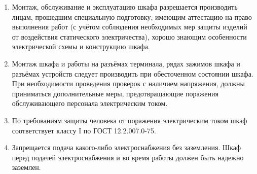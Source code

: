 \begin{enumerate}[label=\arabic{section}.\arabic{subsection}.\arabic{subsubsection}.\arabic*, align=left, labelsep=4pt, leftmargin=0pt, itemindent=2cm]

\item
Монтаж, обслуживание и эксплуатацию шкафа разрешается производить лицам, прошедшим специальную подготовку, имеющим аттестацию на право выполнения работ (с учётом соблюдения необходимых мер защиты изделий от воздействия статического электричества), хорошо знающим особенности электрической схемы и конструкцию шкафа.

\item
Монтаж шкафа и работы на разъёмах терминала, рядах зажимов шкафа и разъёмах устройств следует производить при обесточенном состоянии шкафа.
При необходимости проведения проверок с наличием напряжения, должны приниматься дополнительные меры, предотвращающие поражения обслуживающего персонала электрическим током.

\item
По требованиям защиты человека от поражения электрическим током шкаф соответствует классу I по ГОСТ 12.2.007.0-75.

\item
Запрещается подача какого-либо электроснабжения без заземления.
Шкаф перед подачей электроснабжения и во время работы должен быть надежно заземлен.

\end{enumerate}

%
%
%
%
%

